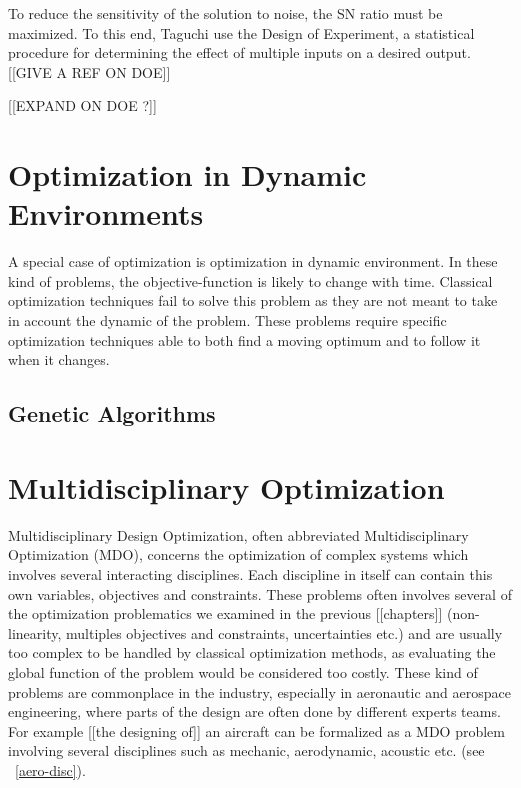 To reduce the sensitivity of the solution to noise, the SN ratio must be maximized. To this end, Taguchi use the Design of Experiment, a statistical procedure for determining the effect of multiple inputs on a desired output. [[GIVE A REF ON DOE]]

[[EXPAND ON DOE  ?]]

\subsection{}

\chapter{Optimization in Dynamic Environments}
A special case of optimization is optimization in dynamic environment. In these kind of problems, the objective-function is likely to change with time.
Classical optimization techniques fail to solve this problem as they are not meant to take in account the dynamic of the problem.
These problems require specific optimization techniques able to both find a moving optimum and to follow it when it changes.

\section{Genetic Algorithms}

\chapter{Multidisciplinary Optimization}

Multidisciplinary Design Optimization, often abbreviated Multidisciplinary Optimization (MDO), concerns the optimization of complex systems which involves several interacting disciplines. Each discipline in itself can contain this own variables, objectives and constraints. These problems often involves several of the optimization problematics we examined in the previous [[chapters]] (non-linearity, multiples objectives and constraints, uncertainties etc.) and are usually too complex to be handled by classical optimization methods, as evaluating the global function of the problem would be considered too costly.
These kind of problems are commonplace in the industry, especially in aeronautic and aerospace engineering, where parts of the design are often done by different experts teams. For example [[the designing of]] an aircraft can be formalized as a MDO problem involving several disciplines such as mechanic, aerodynamic, acoustic etc. (see \figurename\ \ref{aero-disc}).

